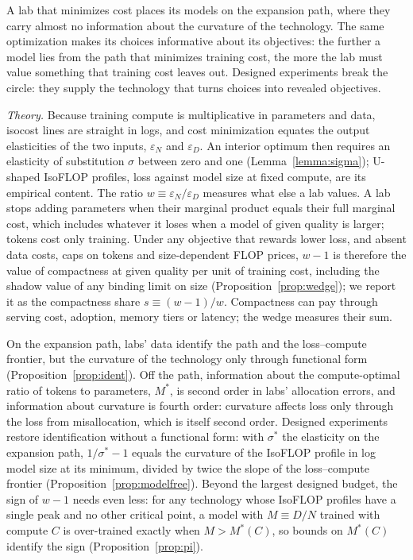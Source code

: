 A lab that minimizes cost places its models on the expansion path, where they carry almost no information about the
curvature of the technology. The same optimization makes its choices informative about its objectives: the further a
model lies from the path that minimizes training cost, the more the lab must value something that training cost leaves
out. Designed experiments break the circle: they supply the technology that turns choices into revealed objectives.

\textit{Theory.} Because training compute is multiplicative in parameters and data, isocost lines are straight in
logs, and cost minimization equates the output elasticities of the two inputs, $\varepsilon_N$ and $\varepsilon_D$. An
interior optimum then requires an elasticity of substitution $\sigma$ between zero and one (Lemma~\ref{lemma:sigma});
U-shaped IsoFLOP profiles, loss against model size at fixed compute, are its empirical content. The ratio
$w\equiv\varepsilon_N/\varepsilon_D$ measures what else a lab values. A lab stops adding parameters when their
marginal product equals their full marginal cost, which includes whatever it loses when a model of given quality is
larger; tokens cost only training. Under any objective that rewards lower loss, and absent data costs, caps on tokens
and size-dependent FLOP prices, $w-1$ is therefore the value of compactness at given quality per unit of training
cost, including the shadow value of any binding limit on size (Proposition~\ref{prop:wedge}); we report it as the
compactness share $s\equiv(w-1)/w$. Compactness can pay through serving cost, adoption, memory tiers or latency; the
wedge measures their sum.

On the expansion path, labs' data identify the path and the loss--compute frontier, but the curvature of the
technology only through functional form (Proposition~\ref{prop:ident}). Off the path, information about the
compute-optimal ratio of tokens to parameters, $M^*$, is second order in labs' allocation errors, and information
about curvature is fourth order: curvature affects loss only through the loss from misallocation, which is itself
second order. Designed experiments restore identification without a functional form: with $\sigma^*$ the elasticity on
the expansion path, $1/\sigma^*-1$ equals the curvature of the IsoFLOP profile in log model size at its minimum,
divided by twice the slope of the loss--compute frontier (Proposition~\ref{prop:modelfree}). Beyond the largest
designed budget, the sign of $w-1$ needs even less: for any technology whose IsoFLOP profiles have a single peak and
no other critical point, a model with $M\equiv D/N$ trained with compute $C$ is over-trained exactly when $M>M^*(C)$,
so bounds on $M^*(C)$ identify the sign (Proposition~\ref{prop:pi}).

